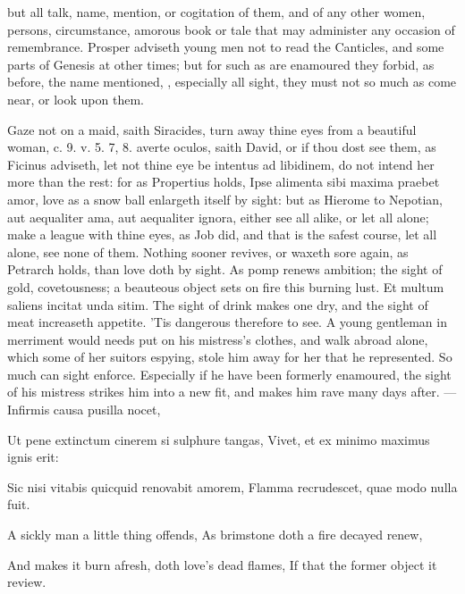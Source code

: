 {but all talk, name, mention, or cogitation of them, and of any other
women, persons, circumstance, amorous book or tale that may administer
any occasion of remembrance. Prosper adviseth young men not to
read the Canticles, and some parts of Genesis at other times; but for
such as are enamoured they forbid, as before, the name mentioned, \etc{},
especially all sight, they must not so much as come near, or look upon
them.

Gaze not on a maid, saith Siracides, turn away thine eyes from a
beautiful woman, c. 9. v. 5. 7, 8. averte oculos, saith David, or if
thou dost see them, as Ficinus adviseth, let not thine eye be intentus
ad libidinem, do not intend her more than the rest: for as
Propertius holds, Ipse alimenta sibi maxima praebet amor, love as
a snow ball enlargeth itself by sight: but as Hierome to Nepotian, aut
aequaliter ama, aut aequaliter ignora, either see all alike, or let all
alone; make a league with thine eyes, as Job did, and that is the
safest course, let all alone, see none of them. Nothing sooner revives,
or waxeth sore again, as Petrarch holds, than love doth by sight.
As pomp renews ambition; the sight of gold, covetousness; a beauteous
object sets on fire this burning lust. Et multum saliens incitat unda
sitim. The sight of drink makes one dry, and the sight of meat
increaseth appetite. 'Tis dangerous therefore to see. A young
gentleman in merriment would needs put on his mistress's clothes, and
walk abroad alone, which some of her suitors espying, stole him away
for her that he represented. So much can sight enforce. Especially if
he have been formerly enamoured, the sight of his mistress strikes him
into a new fit, and makes him rave many days after.
---Infirmis causa pusilla nocet,

Ut pene extinctum cinerem si sulphure tangas,
Vivet, et ex minimo maximus ignis erit:

Sic nisi vitabis quicquid renovabit amorem,
Flamma recrudescet, quae modo nulla fuit.


A sickly man a little thing offends,
As brimstone doth a fire decayed renew,

And makes it burn afresh, doth love's dead flames,
If that the former object it review.

}
